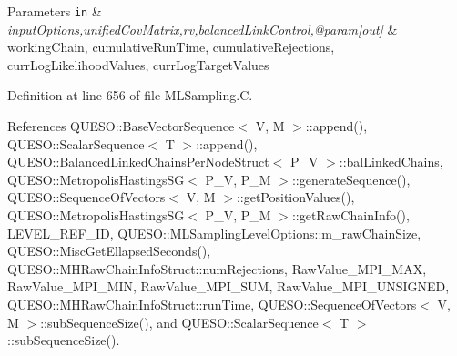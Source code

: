 \begin{DoxyParams}[1]{Parameters}
\mbox{\tt in}  & {\em input\-Options,unified\-Cov\-Matrix,rv,balanced\-Link\-Control,@param\mbox{[}out\mbox{]}} & working\-Chain, cumulative\-Run\-Time, cumulative\-Rejections, curr\-Log\-Likelihood\-Values, curr\-Log\-Target\-Values \\
\hline
\end{DoxyParams}


Definition at line 656 of file M\-L\-Sampling.\-C.



References Q\-U\-E\-S\-O\-::\-Base\-Vector\-Sequence$<$ V, M $>$\-::append(), Q\-U\-E\-S\-O\-::\-Scalar\-Sequence$<$ T $>$\-::append(), Q\-U\-E\-S\-O\-::\-Balanced\-Linked\-Chains\-Per\-Node\-Struct$<$ P\-\_\-\-V $>$\-::bal\-Linked\-Chains, Q\-U\-E\-S\-O\-::\-Metropolis\-Hastings\-S\-G$<$ P\-\_\-\-V, P\-\_\-\-M $>$\-::generate\-Sequence(), Q\-U\-E\-S\-O\-::\-Sequence\-Of\-Vectors$<$ V, M $>$\-::get\-Position\-Values(), Q\-U\-E\-S\-O\-::\-Metropolis\-Hastings\-S\-G$<$ P\-\_\-\-V, P\-\_\-\-M $>$\-::get\-Raw\-Chain\-Info(), L\-E\-V\-E\-L\-\_\-\-R\-E\-F\-\_\-\-I\-D, Q\-U\-E\-S\-O\-::\-M\-L\-Sampling\-Level\-Options\-::m\-\_\-raw\-Chain\-Size, Q\-U\-E\-S\-O\-::\-Misc\-Get\-Ellapsed\-Seconds(), Q\-U\-E\-S\-O\-::\-M\-H\-Raw\-Chain\-Info\-Struct\-::num\-Rejections, Raw\-Value\-\_\-\-M\-P\-I\-\_\-\-M\-A\-X, Raw\-Value\-\_\-\-M\-P\-I\-\_\-\-M\-I\-N, Raw\-Value\-\_\-\-M\-P\-I\-\_\-\-S\-U\-M, Raw\-Value\-\_\-\-M\-P\-I\-\_\-\-U\-N\-S\-I\-G\-N\-E\-D, Q\-U\-E\-S\-O\-::\-M\-H\-Raw\-Chain\-Info\-Struct\-::run\-Time, Q\-U\-E\-S\-O\-::\-Sequence\-Of\-Vectors$<$ V, M $>$\-::sub\-Sequence\-Size(), and Q\-U\-E\-S\-O\-::\-Scalar\-Sequence$<$ T $>$\-::sub\-Sequence\-Size().


